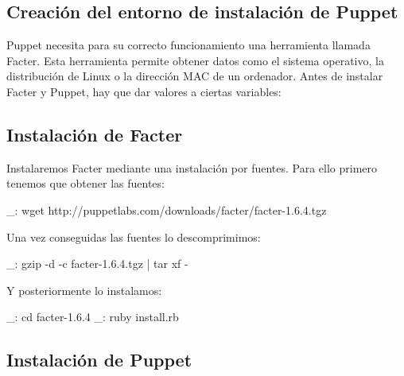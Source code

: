 \subsection{Creación del entorno de instalación de Puppet}

Puppet necesita para su correcto funcionamiento una herramienta llamada Facter. Esta herramienta permite obtener datos como el sistema operativo, la distribución de Linux o la dirección MAC de un ordenador. Antes de instalar Facter y Puppet, hay que dar valores a ciertas variables:



\subsection{Instalación de Facter}

Instalaremos Facter mediante una instalación por fuentes. Para ello primero tenemos que obtener las fuentes:

\begin{bashcode}
_: wget http://puppetlabs.com/downloads/facter/facter-1.6.4.tgz
\end{bashcode}

Una vez conseguidas las fuentes lo descomprimimos:

\begin{bashcode}
_: gzip -d -c facter-1.6.4.tgz | tar xf -
\end{bashcode}

Y posteriormente lo instalamos:

\begin{bashcode}
_: cd facter-1.6.4
_: ruby install.rb
\end{bashcode}


\subsection{Instalación de Puppet}

